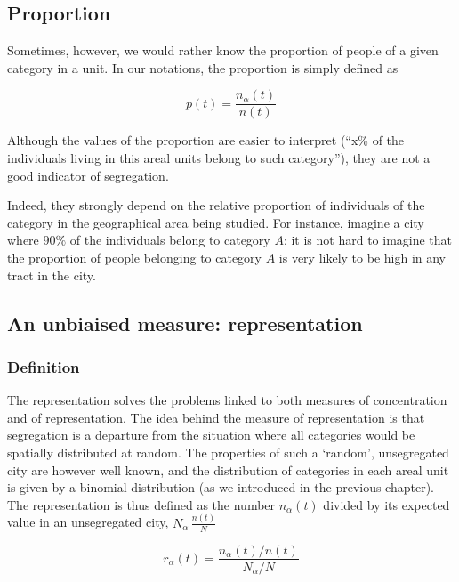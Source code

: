 \subsection{Proportion}
\label{sub:proportion}

Sometimes, however, we would rather know the proportion of people of a given
category in a unit. In our notations, the proportion is simply defined as 

\begin{equation}
    p(t) = \frac{n_\alpha(t)}{n(t)}
\end{equation}

Although the values of the proportion are easier to interpret (``x\% of the
individuals living in this areal units belong to such category''), they are
not a good indicator of segregation. 

Indeed, they strongly depend on the relative proportion of individuals of the
category in the geographical area being studied. For instance, imagine a city
where $90\%$ of the individuals belong to category $A$; it is not hard to
imagine that the proportion of people belonging to category $A$ is very likely
to be high in any tract in the city. 


\subsection{An unbiaised measure: representation}
\label{sub:an_unbiaised_measure_the_representation}

\subsubsection{Definition}
\label{ssub:definition}

The representation solves the problems linked to both measures of concentration
and of representation. The idea behind the measure of representation is that
segregation is a departure from the situation where all categories would be
spatially distributed at random. The properties of such a `random', unsegregated
city are however well known, and the distribution of categories in each areal
unit is given by a binomial distribution (as we introduced in the previous
chapter). The representation is thus defined as the number $n_\alpha(t)$ divided
by its expected value in an unsegregated city, $N_\alpha\,\frac{n(t)}{N}$

\begin{equation}
    r_\alpha(t) = \frac{n_\alpha(t)/n(t)}{N_\alpha/N}
    \label{eq:representation}
\end{equation}

